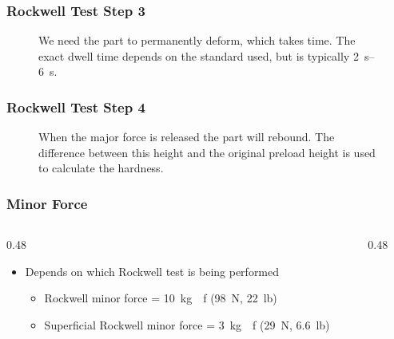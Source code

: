 \begin{frame}
    \frametitle{Rockwell Test Step 3}

    \begin{figure}
        \centering
        \resizebox{\linewidth}{!}{
            
        }

        \vspace{0.5em}
        {\footnotesize We need the part to permanently deform, which takes time. The exact dwell time depends on the standard used, but is typically \qtyrange{2}{6}{\second}.\par}
    \end{figure}
\end{frame}

\begin{frame}
    \frametitle{Rockwell Test Step 4}

    \begin{figure}
        \centering
        \resizebox{\linewidth}{!}{
            
        }

        \vspace{0.5em}
        {\footnotesize When the major force is released the part will rebound. The difference between this height and the original preload height is used to calculate the hardness.\par}
    \end{figure}
\end{frame}

\begin{frame}
	\frametitle{Minor Force}

    \begin{columns}
        \begin{column}{0.48\linewidth}
            \begin{itemize}[<+- | alert@+>]
                \item Depends on which Rockwell test is being performed
                    \begin{itemize}
                        \item Rockwell minor force = \qty{10}{\kilogram{}f} (\qty{98}{\newton}, \qty{22}{lb})
                        \item Superficial Rockwell minor force = \qty{3}{\kilogram{}f} (\qty{29}{\newton}, \qty{6.6}{lb})
                    \end{itemize}
            \end{itemize}
        \end{column}
        \begin{column}{0.48\linewidth}
        \end{column}
    \end{columns}
\end{frame}

